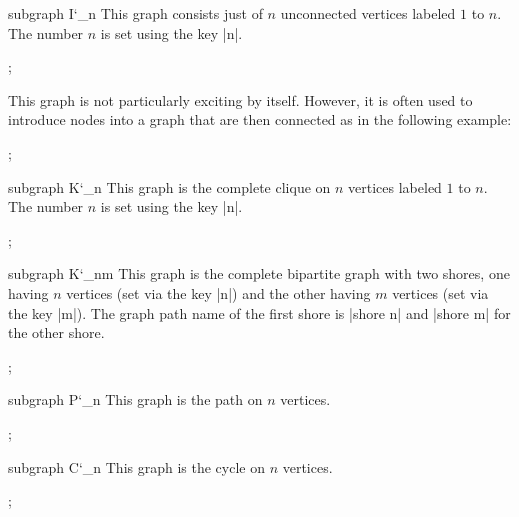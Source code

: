 \begin{graph}{subgraph I\char`\_n}
  This graph consists just of $n$ unconnected vertices labeled $1$ to
  $n$. The number $n$ is set using the key |n|.
\begin{codeexample}[]
\tikz {};    
\end{codeexample}
  This graph is not particularly exciting by itself. However, it is
  often used to introduce nodes into a graph that are then connected
  as in the following example:
\begin{codeexample}[]
\tikz {};    
\end{codeexample}
\end{graph}


\begin{graph}{subgraph K\char`\_n}
  This graph is the complete clique on $n$ vertices labeled $1$ to 
  $n$. The number $n$ is set using the key |n|.
\begin{codeexample}[]
\tikz {};    
\end{codeexample}
\end{graph}


\begin{graph}{subgraph K\char`\_nm}
  This graph is the complete bipartite graph with two shores, one
  having $n$ vertices (set via the key |n|) and the other having $m$
  vertices (set via the key |m|). The graph path name of the first
  shore is |shore n| and |shore m| for the other shore. 
\begin{codeexample}[]
\tikz {};    
\end{codeexample}
\end{graph}


\begin{graph}{subgraph P\char`\_n}
  This graph is the path on $n$ vertices.
\begin{codeexample}[]
\tikz {};    
\end{codeexample}
\end{graph}


\begin{graph}{subgraph C\char`\_n}
  This graph is the cycle on $n$ vertices.
\begin{codeexample}[]
\tikz {};    
\end{codeexample}
\end{graph}



